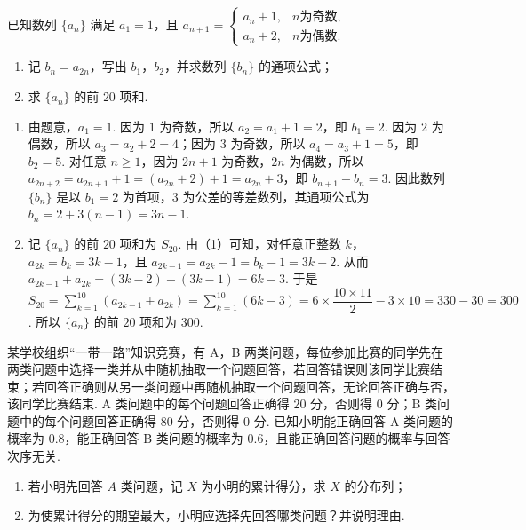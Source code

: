 \begin{problem}
已知数列 \(\{a_n\}\) 满足 \(a_1=1\)，且
\(a_{n+1}=\begin{cases}
a_n+1, & n\text{为奇数},\\
a_n+2, & n\text{为偶数}.
\end{cases}\)

\begin{enumerate}
\item 记 \(b_n=a_{2n}\)，写出 \(b_1\)，\(b_2\)，并求数列 \(\{b_n\}\) 的通项公式；
\item 求 \(\{a_n\}\) 的前 \(20\) 项和.
\end{enumerate}
\end{problem}

\begin{solution}
\begin{enumerate}
    \item 由题意，\(a_1=1\). 因为 \(1\) 为奇数，所以 \(a_2=a_1+1=2\)，即 \(b_1=2\). 因为 \(2\) 为偶数，所以 \(a_3=a_2+2=4\)；因为 \(3\) 为奇数，所以 \(a_4=a_3+1=5\)，即 \(b_2=5\). 对任意 \(n\ge1\)，因为 \(2n+1\) 为奇数，\(2n\) 为偶数，所以 \(a_{2n+2}=a_{2n+1}+1=(a_{2n}+2)+1=a_{2n}+3\)，即 \(b_{n+1}-b_n=3\). 因此数列 \(\{b_n\}\) 是以 \(b_1=2\) 为首项，\(3\) 为公差的等差数列，其通项公式为 \(b_n=2+3(n-1)=3n-1\).
    \item 记 \(\{a_n\}\) 的前 \(20\) 项和为 \(S_{20}\). 由（1）可知，对任意正整数 \(k\)，\(a_{2k}=b_k=3k-1\)，且 \(a_{2k-1}=a_{2k}-1=b_k-1=3k-2\). 从而 \(a_{2k-1}+a_{2k}=(3k-2)+(3k-1)=6k-3\). 于是 \(S_{20}=\sum_{k=1}^{10}(a_{2k-1}+a_{2k})=\sum_{k=1}^{10}(6k-3)=6\times\dfrac{10\times11}{2}-3\times10=330-30=300\). 所以 \(\{a_n\}\) 的前 \(20\) 项和为 \(300\).
\end{enumerate}
\end{solution}

\begin{problem}
某学校组织“一带一路”知识竞赛，有 A，B 两类问题，每位参加比赛的同学先在两类问题中选择一类并从中随机抽取一个问题回答，若回答错误则该同学比赛结束；若回答正确则从另一类问题中再随机抽取一个问题回答，无论回答正确与否，该同学比赛结束. A 类问题中的每个问题回答正确得 \(20\) 分，否则得 \(0\) 分；B 类问题中的每个问题回答正确得 \(80\) 分，否则得 \(0\) 分. 已知小明能正确回答 A 类问题的概率为 \(0.8\)，能正确回答 B 类问题的概率为 \(0.6\)，且能正确回答问题的概率与回答次序无关.

\begin{enumerate}
\item 若小明先回答 \(A\) 类问题，记 \(X\) 为小明的累计得分，求 \(X\) 的分布列；
\item 为使累计得分的期望最大，小明应选择先回答哪类问题？并说明理由.
\end{enumerate}
\end{problem}

